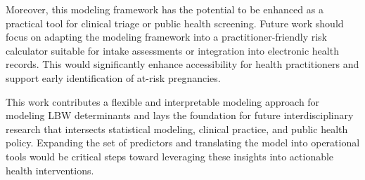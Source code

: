 Moreover, this modeling framework has the potential to be enhanced as a practical tool for clinical triage or public health screening. Future work should focus on adapting the modeling framework into a practitioner-friendly risk calculator suitable for intake assessments or integration into electronic health records. This would significantly enhance accessibility for health practitioners and support early identification of at-risk pregnancies. 

This work contributes a flexible and interpretable modeling approach for modeling LBW determinants and lays the foundation for future interdisciplinary research that intersects statistical modeling, clinical practice, and public health policy. Expanding the set of predictors and translating the model into operational tools would be critical steps toward leveraging these insights into actionable health interventions.





\newpage